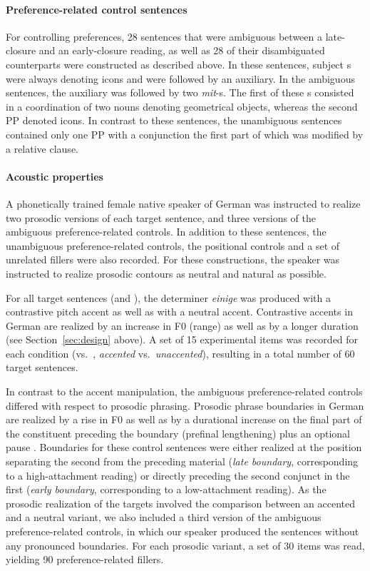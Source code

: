 \documentclass[fleqn,reqno,10pt,draft]{article}
\newcommand{\as}{\acro{as}}
\renewcommand{\es}{\acro{es}}
\begin{document}
\paragraph{Preference-related control sentences}
For controlling preferences, 28 sentences that were ambiguous between
a late-closure and an early-closure reading, as well as 28 of their
disambiguated counterparts were constructed as described above. In
these sentences, subject {\small {}}s were always denoting
icons and were followed by an auxiliary. In the ambiguous sentences,
the auxiliary was followed by two {\it mit}-{\small {}}s.  The
first of these {\small {}}s consisted in a coordination of two
nouns denoting geometrical objects, whereas the second PP denoted
icons. In contrast to these sentences, the unambiguous sentences
contained only one PP with a conjunction the first part of which was
modified by a relative clause.

\paragraph{Acoustic properties}
A phonetically trained female native speaker of German was instructed
to realize two prosodic versions of each target sentence, and three
versions of the ambiguous preference-related controls. In addition to these
sentences, the unambiguous preference-related controls, the positional controls
and a set of unrelated fillers were also recorded. For these constructions, the speaker was instructed
to realize prosodic contours as neutral and natural as possible.

For all target sentences (\as and \es), the determiner \emph{einige} was
produced with a contrastive pitch accent as well as with a neutral
accent. Contrastive accents in German are realized by an increase in F0 (range)
as well as by a longer duration (see Section~\ref{sec:design} above). A set of 15 
experimental items was recorded for each condition (\as vs.~\es, \emph{accented} 
vs.~\emph{unaccented}), resulting in a total number of 60 target sentences.

In contrast to the accent manipulation, the ambiguous preference-related controls
differed with respect to prosodic phrasing. Prosodic phrase boundaries
in German are realized by a rise in F0 as well as by a durational
increase on the final part of the constituent preceding the boundary
(prefinal lengthening) plus an optional pause \citep[e.g.][]{Vaissiere83,Fery93}.
Boundaries for these control sentences were either realized at the position 
separating the second {\small {}}
from the preceding material (\emph{late boundary}, corresponding to a
high-attachment reading) or directly preceding the second conjunct in
the first {\small {}} (\emph{early boundary}, corresponding to a
low-attachment reading). As the prosodic realization of the targets
involved the comparison between an accented and a neutral variant, we
also included a third version of the ambiguous preference-related controls, in which our
speaker produced the sentences without any pronounced
boundaries. For each prosodic variant, a set of
30 items was read, yielding 90 preference-related fillers.
\end{document}
